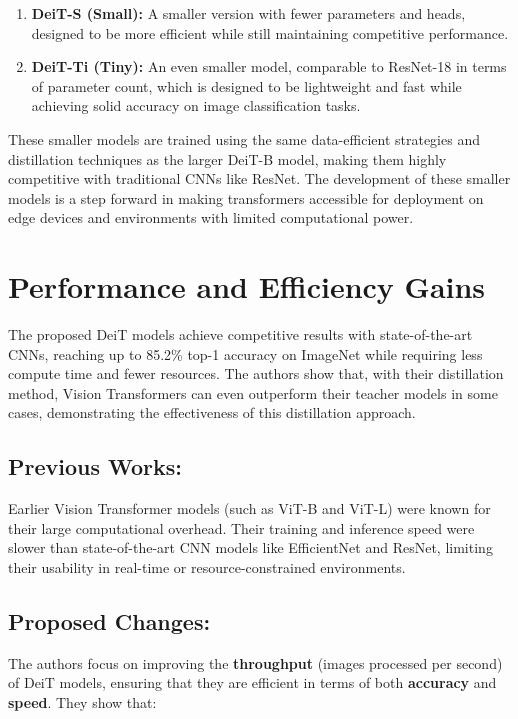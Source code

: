 \documentclass{report}
\begin{document}
	\begin{enumerate}
		\item 
		\textbf{DeiT-S (Small):} A smaller version with fewer parameters and heads, designed to be more efficient while still maintaining competitive performance.
		
		\item 
		\textbf{DeiT-Ti (Tiny):} An even smaller model, comparable to ResNet-18 in terms of parameter count, which is designed to be lightweight and fast while achieving solid accuracy on image classification tasks.
	\end{enumerate}
	These smaller models are trained using the same data-efficient strategies and distillation techniques as the larger DeiT-B model, making them highly competitive with traditional CNNs like ResNet. The development of these smaller models is a step forward in making transformers accessible for deployment on edge devices and environments with limited computational power.
	
	
	
	
	\section{Performance and Efficiency Gains}
	The proposed DeiT models achieve competitive results with state-of-the-art CNNs, reaching up to 85.2\% top-1 accuracy on ImageNet while requiring less compute time and fewer resources. The authors show that, with their distillation method, Vision Transformers can even outperform their teacher models in some cases, demonstrating the effectiveness of this distillation approach.
	
	
	\subsection{Previous Works:}
	Earlier Vision Transformer models (such as ViT-B and ViT-L) were known for their large computational overhead. Their training and inference speed were slower than state-of-the-art CNN models like EfficientNet and ResNet, limiting their usability in real-time or resource-constrained environments.
	
	
	\subsection{Proposed Changes:}
	The authors focus on improving the \textbf{throughput} (images processed per second) of DeiT models, ensuring that they are efficient in terms of both \textbf{accuracy} and \textbf{speed}. They show that:
	
\end{document}
